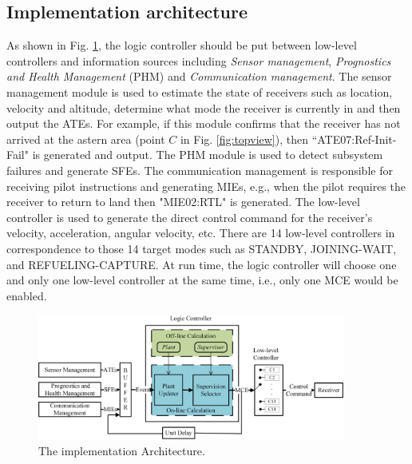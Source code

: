 \subsection{Implementation architecture}
As shown in Fig. \ref{fig:implementation}, the logic controller should be put between low-level controllers and information sources including \textit{Sensor management}, \textit{Prognostics and Health Management} (PHM) \cite{kalgren2006defining} and \textit{Communication management}. The sensor management module is used to estimate the state of receivers such as location, velocity and altitude, determine what mode the receiver is currently in and then output the ATEs. For example, if this module confirms that the receiver has not arrived at the astern area (point $ C $ in Fig. \ref{fig:topview}), then ``ATE07:Ref-Init-Fail" is generated and output. The PHM module is used to detect subsystem failures and generate SFEs. The communication management is responsible for receiving pilot instructions and generating MIEs, e.g., when the pilot requires the receiver to return to land then "MIE02:RTL" is generated. The low-level controller is used to generate the direct control command for the receiver's velocity, acceleration, angular velocity, etc. There are 14 low-level controllers in correspondence to those 14 target modes such as STANDBY, JOINING-WAIT, and REFUELING-CAPTURE. At run time, the logic controller will choose one and only one low-level controller at the same time, i.e., only one MCE would be enabled.
\begin{figure}[h]
	\begin{center}
		\includegraphics[width=0.9\textwidth]{Figures/Figs_Ch14/Fig22_ImpScheme}
		\par\end{center}
	\caption{The implementation Architecture.}
	\label{fig:implementation} 
\end{figure}	


